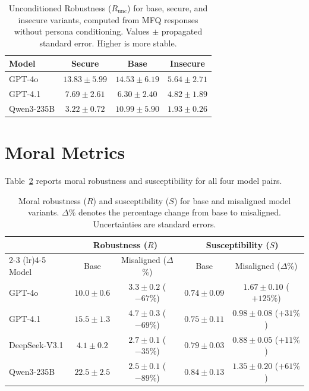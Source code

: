 \documentclass{article}
\begin{document}
\begin{table}[h]
  \centering
  \caption{Unconditioned Robustness ($R_{\text{unc}}$) for base, secure, and insecure variants, computed from MFQ responses without persona conditioning. Values $\pm$ propagated standard error. Higher is more stable.}
  \label{tab:self_robustness}
  \begin{tabular}{lccc}
    \toprule
    \textbf{Model} & \textbf{Secure} & \textbf{Base} & \textbf{Insecure} \\
    \midrule
    GPT-4o      & $13.83 \pm 5.99$ & $14.53 \pm 6.19$ & $5.64 \pm 2.71$ \\
    GPT-4.1     & $7.69 \pm 2.61$  & $6.30 \pm 2.40$  & $4.82 \pm 1.89$ \\
    Qwen3-235B  & $3.22 \pm 0.72$  & $10.99 \pm 5.90$ & $1.93 \pm 0.26$ \\
    \bottomrule
  \end{tabular}
\end{table}

\section{Moral Metrics}
\label{app:metrics}

Table~\ref{tab:metrics} reports moral robustness and susceptibility for all four model pairs.

\begin{table}[h]
  \centering
  \caption{Moral robustness ($R$) and susceptibility ($S$) for base and misaligned model variants. $\Delta$\% denotes the percentage change from base to misaligned. Uncertainties are standard errors.}
  \label{tab:metrics}
  \small
  \begin{tabular}{l cc cc}
    \toprule
    & \multicolumn{2}{c}{Robustness ($R$)} & \multicolumn{2}{c}{Susceptibility ($S$)} \\
    \cmidrule(lr){2-3} \cmidrule(lr){4-5}
    Model & Base & Misaligned ($\Delta$\%) & Base & Misaligned ($\Delta$\%) \\
    \midrule
    GPT-4o         & $10.0 \pm 0.6$ & $3.3 \pm 0.2$ ($-67\%$) & $0.74 \pm 0.09$ & $1.67 \pm 0.10$ ($+125\%$) \\
    GPT-4.1        & $15.5 \pm 1.3$ & $4.7 \pm 0.3$ ($-69\%$) & $0.75 \pm 0.11$ & $0.98 \pm 0.08$ ($+31\%$) \\
    DeepSeek-V3.1  & $4.1 \pm 0.2$  & $2.7 \pm 0.1$ ($-35\%$) & $0.79 \pm 0.03$ & $0.88 \pm 0.05$ ($+11\%$) \\
    Qwen3-235B     & $22.5 \pm 2.5$ & $2.5 \pm 0.1$ ($-89\%$) & $0.84 \pm 0.13$ & $1.35 \pm 0.20$ ($+61\%$) \\
    \bottomrule
  \end{tabular}
\end{table}
\end{document}

